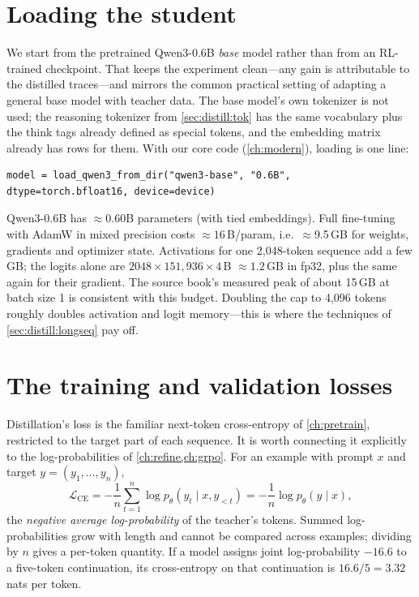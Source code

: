 \section{Loading the student}\label{sec:distill:model}

We start from the pretrained Qwen3-0.6B \emph{base} model rather than from an RL-trained
checkpoint. That keeps the experiment clean---any gain is attributable to the distilled
traces---and mirrors the common practical setting of adapting a general base model with
teacher data. The base model's own tokenizer is not used; the reasoning tokenizer from
\cref{sec:distill:tok} has the same vocabulary plus the think tags already defined as special
tokens, and the embedding matrix already has rows for them. With our core code
(\cref{ch:modern}), loading is one line:
\begin{lstlisting}
model = load_qwen3_from_dir("qwen3-base", "0.6B", dtype=torch.bfloat16, device=device)
\end{lstlisting}

\begin{napkinmath}
Qwen3-0.6B has $\approx$0.60B parameters (with tied embeddings). Full fine-tuning with AdamW in
mixed precision costs $\approx 16$\,B/param, i.e.\ $\approx$9.5\,GB for weights, gradients and
optimizer state. Activations for one 2{,}048-token sequence add a few GB; the logits alone are
$2048\times151{,}936\times 4$\,B $\approx 1.2$\,GB in fp32, plus the same again for their gradient.
The source book's measured peak of about 15\,GB at batch size 1 is consistent with this budget.
Doubling the cap to 4{,}096 tokens roughly doubles activation and logit memory---this is where
the techniques of \cref{sec:distill:longseq} pay off.
\end{napkinmath}

\section{The training and validation losses}\label{sec:distill:loss}

Distillation's loss is the familiar next-token cross-entropy of \cref{ch:pretrain}, restricted to
the target part of each sequence. It is worth connecting it explicitly to the log-probabilities
of \cref{ch:refine,ch:grpo}. For an example with prompt $x$ and target $y=(y_1,\dots,y_n)$,
\begin{equation}
\mathcal{L}_{\text{CE}} = -\frac{1}{n}\sum_{t=1}^{n}\log p_\theta(y_t\mid x, y_{<t})
= -\frac{1}{n}\log p_\theta(y\mid x),
\label{eq:distill:ce}
\end{equation}
the \emph{negative average log-probability} of the teacher's tokens. Summed log-probabilities
grow with length and cannot be compared across examples; dividing by $n$ gives a per-token
quantity. If a model assigns joint log-probability $-16.6$ to a five-token continuation, its
cross-entropy on that continuation is $16.6/5 = 3.32$ nats per token.

